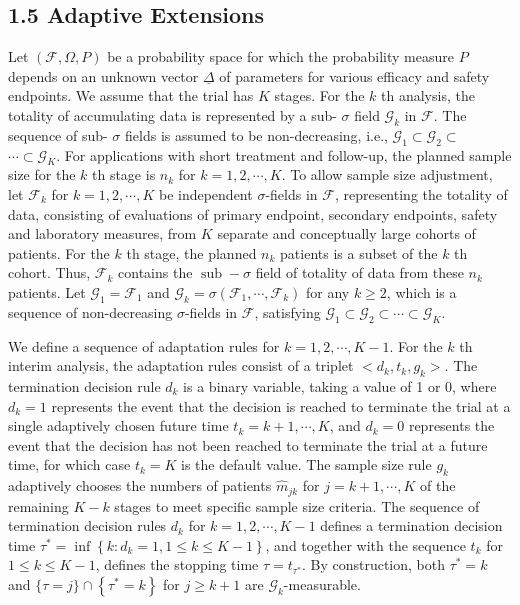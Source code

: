\documentclass[10pt]{article}
\begin{document}
\subsection*{1.5 Adaptive Extensions}
Let $(\mathcal{F}, \Omega, P)$ be a probability space for which the probability measure $P$ depends on an unknown vector $\underline{\Delta}$ of parameters for various efficacy and safety endpoints. We assume that the trial has $K$ stages. For the $k$ th analysis, the totality of accumulating data is represented by a sub- $\sigma$ field $\mathcal{G}_{k}$ in $\mathcal{F}$. The sequence of sub- $\sigma$ fields is assumed to be non-decreasing, i.e., $\mathcal{G}_{1} \subset \mathcal{G}_{2} \subset$\\
$\cdots \subset \mathcal{G}_{K}$. For applications with short treatment and follow-up, the planned sample size for the $k$ th stage is $n_{k}$ for $k=1,2, \cdots, K$. To allow sample size adjustment, let $\mathcal{F}_{k}$ for $k=1,2, \cdots, K$ be independent $\sigma$-fields in $\mathcal{F}$, representing the totality of data, consisting of evaluations of primary endpoint, secondary endpoints, safety and laboratory measures, from $K$ separate and conceptually large cohorts of patients. For the $k$ th stage, the planned $n_{k}$ patients is a subset of the $k$ th cohort. Thus, $\mathcal{F}_{k}$ contains the $\operatorname{sub}-\sigma$ field of totality of data from these $n_{k}$ patients. Let $\mathcal{G}_{1}=\mathcal{F}_{1}$ and $\mathcal{G}_{k}=\sigma\left(\mathcal{F}_{1}, \cdots, \mathcal{F}_{k}\right)$ for any $k \geq 2$, which is a sequence of non-decreasing $\sigma$-fields in $\mathcal{F}$, satisfying $\mathcal{G}_{1} \subset \mathcal{G}_{2} \subset \cdots \subset \mathcal{G}_{K}$.

We define a sequence of adaptation rules for $k=1,2, \cdots, K-1$. For the $k$ th interim analysis, the adaptation rules consist of a triplet $<d_{k}, t_{k}, g_{k}>$. The termination decision rule $d_{k}$ is a binary variable, taking a value of 1 or 0, where $d_{k}=1$ represents the event that the decision is reached to terminate the trial at a single adaptively chosen future time $t_{k}=k+1, \cdots, K$, and $d_{k}=0$ represents the event that the decision has not been reached to terminate the trial at a future time, for which case $t_{k}=K$ is the default value. The sample size rule $g_{k}$ adaptively chooses the numbers of patients $\hat{m}_{j k}$ for $j=k+1, \cdots, K$ of the remaining $K-k$ stages to meet specific sample size criteria. The sequence of termination decision rules $d_{k}$ for $k=1,2, \cdots, K-1$ defines a termination decision time $\tau^{*}=\inf \left\{k: d_{k}=1,1 \leq k \leq K-1\right\}$, and together with the sequence $t_{k}$ for $1 \leq k \leq K-1$, defines the stopping time $\tau=t_{\tau^{*}}$. By construction, both $\tau^{*}=k$ and $\{\tau=j\} \cap\left\{\tau^{*}=k\right\}$ for $j \geq k+1$ are $\mathcal{G}_{k}$-measurable.
\end{document}
